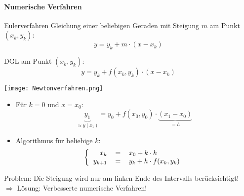 \paragraph{Numerische Verfahren}
\begin{definition}{Eulerverfahren}
  Gleichung einer beliebigen Geraden mit Steigung \(m\) am Punkt \((x_k,y_k)\):
      \[y=y_k+m\cdot(x-x_k)\]
    \begin{minipage}{0.5\linewidth}
      DGL am Punkt \((x_k,y_k)\):
      \[y=y_k+f(x_k,y_k)\cdot (x-x_k)\]
    \end{minipage}
    \begin{minipage}{0.45\linewidth}
      \begin{center}
        \texttt{[image: Newtonverfahren.png]}
        \end{center}
    \end{minipage}
  \begin{itemize}

    \item Für \(k=0 \text{ und } x=x_0\):
      \[\underbrace{y_1}_{\approx y(x_1)}=y_0+f(x_0,y_0)\cdot\underbrace{(x_1-x_0)}_{=h}\]
    \item Algorithmus für beliebige \(k\):
      \[\left\{\begin{tabular}{rcl}
	  \(x_k\)&\(=\)&\(x_0+k\cdot h\)\\
	  \(y_{k+1}\)&\(=\)&\(y_k+h\cdot f(x_k,y_k)\)
	\end{tabular}
      \right.\]
  \end{itemize}
  Problem: Die Steigung wird nur am linken Ende des Intervalls berücksichtigt!
    \\ $\Rightarrow$ Lösung: Verbesserte numerische Verfahren!
\end{definition}
